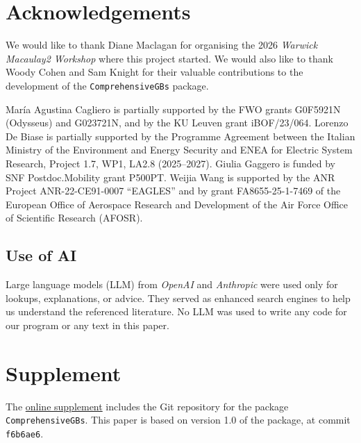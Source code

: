 \documentclass[11pt]{amsart}
\theoremstyle{plain}
\theoremstyle{definition}
\theoremstyle{remark}
\begin{document}
\section*{Acknowledgements}

We would like to thank Diane Maclagan for organising the 2026 \textit{Warwick Macaulay2 Workshop} where this project started.
We would also like to thank Woody Cohen and Sam Knight for their valuable contributions to the development of the \texttt{ComprehensiveGBs} package.


María Agustina Cagliero is partially supported by the FWO grants G0F5921N (Odysseus) and G023721N, and by the KU Leuven grant iBOF/23/064.
Lorenzo De Biase is partially supported by the Programme Agreement between the Italian Ministry of the Environment and Energy Security  and ENEA for Electric System Research, Project 1.7, WP1, LA2.8 (2025–2027).
Giulia Gaggero is funded by SNF Postdoc.Mobility grant P500PT.
Weijia Wang is supported by the ANR Project ANR-22-CE91-0007 ``EAGLES''
and by grant FA8655-25-1-7469 of the European Office of Aerospace Research and Development of the Air Force Office of Scientific Research (AFOSR).

\subsection*{Use of AI} Large language models (LLM) from \emph{OpenAI} and \emph{Anthropic} were used only for lookups, explanations, or advice. They served as enhanced search engines to help us understand the referenced literature. No LLM was used to write any code for our program or any text in this paper.


\section*{Supplement}

The \href{https://github.com/Macaulay2/Workshop-2026-Warwick/tree/CGBs}{online supplement} includes the Git repository for the package \texttt{ComprehensiveGBs}. This paper is based on version 1.0 of the package, at commit \texttt{f6b6ae6}.



\end{document}
